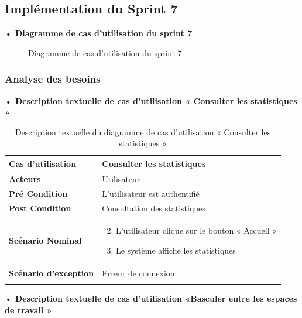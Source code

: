 \subsection{Implémentation du Sprint 7}
\textbf{•	Diagramme de cas d'utilisation du sprint 7}

\begin{figure}[H]
  \centering
  \caption{Diagramme de cas d'utilisation du sprint 7}
  \label{fig:UseCaseDiagramSp71}
\end{figure}

\subsubsection{Analyse des besoins}
\textbf{•	Description textuelle de cas d'utilisation « Consulter les statistiques »}

\begin{longtable}{|p{5cm}|p{10cm}|}
\hline
\textbf{Cas d'utilisation}&Consulter les statistiques\\
\hline
\textbf{Acteurs}&Utilisateur\\
\hline
\textbf{Pré Condition}&L'utilisateur est authentifié\\
\hline
\textbf{Post Condition}&Consultation des statistiques\\
\hline
\textbf{Scénario Nominal}&
\vspace{-\baselineskip}
\begin{enumerate}
  \setcounter{enumi}{1}
      \item L'utilisateur clique sur le bouton « Accueil »
      \item  Le système affiche les statistiques
\end{enumerate}\\
\hline
\textbf{Scénario d'exception}&Erreur de connexion\\
\hline
\caption{Description textuelle du diagramme de cas d'utilisation « Consulter les statistiques »}
\label{tab:use_case_consulter_statistiques}
\end{longtable}

\textbf{•	Description textuelle de cas d'utilisation «Basculer entre les espaces de travail »}

